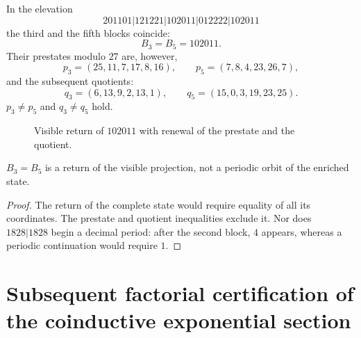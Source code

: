 In the elevation
\[
 201101|121221|102011|012222|102011
\]
the third and the fifth blocks coincide:
\[
 B_3=B_5=102011.
\]
Their prestates modulo \(27\) are, however,
\[
 p_3=(25,11,7,17,8,16),
 \qquad
 p_5=(7,8,4,23,26,7),
\]
and the subsequent quotients:
\[
 q_3=(6,13,9,2,13,1),
 \qquad
 q_5=(15,0,3,19,23,25).
\]
\(p_3\ne p_5\) and \(q_3\ne q_5\) hold.

\begin{figure}[htbp]
\centering
{}
\caption{Visible return of \(102011\) with renewal of the prestate and the
quotient.}
\label{gfp:b:fig:ruptura-memoria-e}
\end{figure}

\begin{theorem}
\label{gfp:b:thm:retorno-visible-no-periodico-e}
\(B_3=B_5\) is a return of the visible projection, not a periodic orbit
of the enriched state.
\end{theorem}

\begin{proof}
The return of the complete state would require equality of all its coordinates.
The prestate and quotient inequalities exclude it. Nor does
\(1828|1828\) begin a decimal period: after the second block,
\(4\) appears, whereas a periodic continuation would require \(1\).
\end{proof}

\section{Subsequent factorial certification of the coinductive exponential section}

